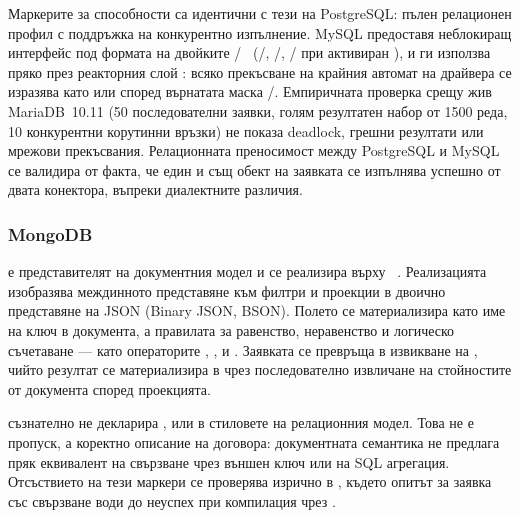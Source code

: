 Маркерите за способности са идентични с тези на PostgreSQL: пълен релационен профил с поддръжка на конкурентно изпълнение. MySQL предоставя неблокиращ интерфейс под формата на двойките /~\cite{mysql_capi_async} (/, /, / при активиран ), и  ги използва пряко през реакторния слой : всяко прекъсване на крайния автомат на драйвера се изразява като  или  според върнатата маска /. Емпиричната проверка срещу жив MariaDB~10.11 (50 последователни заявки, голям резултатен набор от 1500 реда, 10 конкурентни корутинни връзки) не показа deadlock, грешни резултати или мрежови прекъсвания. Релационната преносимост между PostgreSQL и MySQL се валидира от факта, че един и същ обект на заявката се изпълнява успешно от двата конектора, въпреки диалектните различия.

\subsubsection{MongoDB}

 е представителят на документния модел и се реализира върху ~\cite{mongoc_client_pool}. Реализацията изобразява междинното представяне към филтри и проекции в двоично представяне на JSON (Binary JSON, BSON). Полето  се материализира като име на ключ в документа, а правилата за равенство, неравенство и логическо съчетаване --- като операторите , ,  и . Заявката  се превръща в извикване на , чийто резултат се материализира в  чрез последователно извличане на стойностите от документа според проекцията.

 съзнателно не декларира ,  или  в стиловете на релационния модел. Това не е пропуск, а коректно описание на договора: документната семантика не предлага пряк еквивалент на свързване чрез външен ключ или на SQL агрегация. Отсъствието на тези маркери се проверява изрично в , където опитът за заявка със свързване води до неуспех при компилация чрез .

